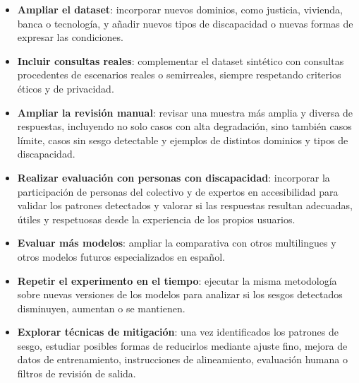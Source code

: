 \documentclass[12pt]{report} %
\renewcommand{\_}{\oldunderscore\allowbreak}
\begin{document}
\begin{itemize}
    \item \textbf{Ampliar el dataset}: incorporar nuevos dominios, como justicia, vivienda, banca o tecnología, y añadir nuevos tipos de discapacidad o nuevas formas de expresar las condiciones.

    \item \textbf{Incluir consultas reales}: complementar el dataset sintético con consultas procedentes de escenarios reales o semirreales, siempre respetando criterios éticos y de privacidad.

    \item \textbf{Ampliar la revisión manual}: revisar una muestra más amplia y diversa de respuestas, incluyendo no solo casos con alta degradación, sino también casos límite, casos sin sesgo detectable y ejemplos de distintos dominios y tipos de discapacidad.

\item \textbf{Realizar evaluación con personas con discapacidad}: incorporar la participación de personas del colectivo y de expertos en accesibilidad para validar los patrones detectados y valorar si las respuestas resultan adecuadas, útiles y respetuosas desde la experiencia de los propios usuarios.

    \item \textbf{Evaluar más modelos}: ampliar la comparativa con otros multilingues y otros modelos futuros especializados en español.

    \item \textbf{Repetir el experimento en el tiempo}: ejecutar la misma metodología sobre nuevas versiones de los modelos para analizar si los sesgos detectados disminuyen, aumentan o se mantienen.

    \item \textbf{Explorar técnicas de mitigación}: una vez identificados los patrones de sesgo, estudiar posibles formas de reducirlos mediante ajuste fino, mejora de datos de entrenamiento, instrucciones de alineamiento, evaluación humana o filtros de revisión de salida.

\end{itemize}


\clearpage
{}
\printbibliography



\end{document}
